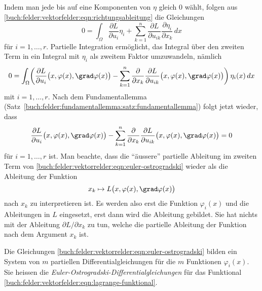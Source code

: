Indem man jede bis auf eine Komponenten von $\eta$ gleich $0$
wählt, folgen aus
\eqref{buch:felder:vektorfelder:eqn:richtungsableitung}
die Gleichungen
\begin{equation*}
0
=
\int_{\Omega}
\frac{\partial L}{\partial u_i}
\eta_i
+
\sum_{k=1}^n
\frac{\partial L}{\partial u_{ik}}
\frac{\partial \eta_i}{\partial x_k}
\,dx
\end{equation*}
für $i=1,\dots,r$.
Partielle Integration ermöglicht, das Integral über den zweiten
Term in ein Integral mit $\eta_i$ als zweitem Faktor umzuwandeln,
nämlich
\begin{equation*}
0
=
\int_{\Omega}
\biggl(
\frac{\partial L}{\partial u_i}
\bigl(x,\varphi(x),\grad\varphi(x)\bigr)
-
\sum_{k=1}^n
\frac{\partial}{\partial x_k}
\frac{\partial L}{\partial u_{ik}}
\bigl(x,\varphi(x),\grad\varphi(x)\bigr)
\biggr)
\,
\eta_i(x)
\,dx
\end{equation*}
mit $i=1,\dots, r$.
Nach dem Fundamentallemma
(Satz~\ref{buch:felder:fundamentallemma:satz:fundamentallemma})
folgt jetzt wieder, dass
\begin{equation}
\frac{\partial L}{\partial u_i}
\bigl(x,\varphi(x),\grad\varphi(x)\bigr)
-
\sum_{k=1}^n
\frac{\partial}{\partial x_k}
\frac{\partial L}{\partial u_{ik}}
\bigl(x,\varphi(x),\grad\varphi(x)\bigr)
=
0
\label{buch:felder:vektorrelder:eqn:euler-ostrogradski}
\end{equation}
für $i=1,\dots, r$ ist.
Man beachte, dass die ``äussere'' partielle Ableitung im zweiten Term
von
\eqref{buch:felder:vektorrelder:eqn:euler-ostrogradski}
wieder als die Ableitung der Funktion
\[
x_k
\mapsto
L\bigl(x,\varphi(x),\grad\varphi(x)\bigr)
\]
nach $x_k$ zu interpretieren ist.
Es werden also erst die Funktion $\varphi_i(x)$ und die Ableitungen
in $L$ eingesetzt, erst dann wird die Ableitung gebildet.
Sie hat nichts mit der Ableitung $\partial L/\partial x_k$ zu tun, welche
die partielle Ableitung der Funktion nach dem Argument $x_k$ ist.


Die Gleichungen
\eqref{buch:felder:vektorrelder:eqn:euler-ostrogradski}
bilden ein System von $m$ partiellen Differentialgleichungen
für die $m$ Funktionen $\varphi_i(x)$.
Sie heissen die {\em Euler-Ostrogradski-Differentialgleichungen}
für das Funktional
\eqref{buch:felder:vektorfelder:eqn:lagrange-funktional}.



